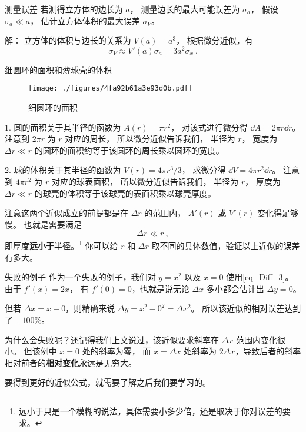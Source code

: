 \begin{example}{测量误差}\label{ex_Diff_1}
若测得立方体的边长为 $a$， 测量边长的最大可能误差为 $\sigma_a$， 假设 $\sigma_a \ll a$， 估计立方体体积的最大误差 $\sigma_V$。

解： 立方体的体积与边长的关系为 $V(a)=a^3$， 根据微分近似，有
\begin{equation}
\sigma_V \approx V'(a) \sigma_a = 3a^2 \sigma_x~.
\end{equation}
\end{example}

\begin{example}{细圆环的面积和薄球壳的体积}\label{ex_Diff_2}
\begin{figure}[ht]
\centering
\texttt{[image: ./figures/4fa92b61a3e93d0b.pdf]}
\caption{细圆环的面积} \label{fig_Diff_2}
\end{figure}

1. 圆的面积关于其半径的函数为 $A(r) = \pi r^2$， 对该式进行微分得 $\dd{A} = 2\pi r\dd{r}$。 注意到 $2\pi r$ 为 $r$ 对应的周长， 所以微分近似告诉我们， 半径为 $r$， 宽度为 $\Delta r \ll r$ 的圆环的面积约等于该圆环的周长乘以圆环的宽度。

2. 球的体积关于其半径的函数为 $V(r) = 4\pi r^3/3$， 求微分得 $\dd{V} = 4\pi r^2 \dd{r}$。 注意到 $4\pi r^2$ 为 $r$ 对应的球表面积， 所以微分近似告诉我们， 半径为 $r$， 厚度为 $\Delta r \ll r$ 的球壳的体积等于该球壳的表面积乘以球壳厚度。

注意这两个近似成立的前提都是在 $\Delta r$ 的范围内， $A'(r)$ 或 $V'(r)$ 变化得足够慢。 也就是需要满足
\begin{equation}
\Delta r \ll r~,
\end{equation}
即厚度\textbf{远小于}半径。\footnote{远小于只是一个模糊的说法，具体需要小多少倍，还是取决于你对误差的要求。} 你可以给 $r$ 和 $\Delta r$ 取不同的具体数值，验证以上近似的误差有多大。
\end{example}

\begin{example}{失败的例子}
作为一个失败的例子，我们对 $y = x^2$ 以及 $x=0$ 使用\autoref{eq_Diff_3}。 由于 $f'(x) = 2x$， 有 $f'(0) = 0$，也就是说无论 $\Delta x$ 多小都会估计出 $\Delta y = 0$。

但若 $\Delta x = x - 0$，则精确来说 $\Delta y = x^2 - 0^2 = \Delta x^2$。 所以该近似的相对误差达到了 $-100\%$。

为什么会失败呢？还记得我们上文说过，该近似要求斜率在 $\Delta x$ 范围内变化很小。 但该例中 $x=0$ 处的斜率为零， 而 $x=\Delta x$ 处斜率为 $2\Delta x$，导致后者的斜率相对前者的\textbf{相对变化}永远是无穷大。
\end{example}

要得到更好的近似公式，就需要了解之后我们要学习的。
